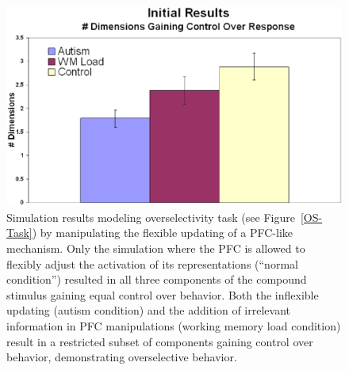 \documentclass[man]{apa}
\begin{document}
\begin{figure}
\begin{center}
	\includegraphics[width=125mm]{graphs/overselectivity_results_new.eps}
\end{center}
\caption{Simulation results modeling overselectivity task (see Figure~\ref{OS-Task}) by manipulating the flexible updating of a PFC-like mechanism. Only the simulation where the PFC is allowed to flexibly adjust the activation of its representations (``normal condition'') resulted in all three components of the compound stimulus gaining equal control over behavior.  Both the inflexible updating (autism condition) and the addition of irrelevant information in PFC manipulations (working memory load condition) result in a restricted subset of components gaining control over behavior, demonstrating overselective behavior.}
\label{OS-Model-Results-2}
\end{figure} 
\end{document}

